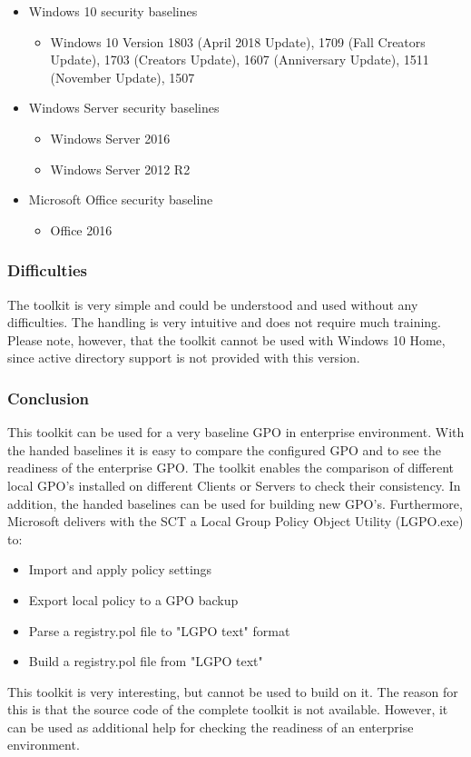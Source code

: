 \begin{itemize}
    \item Windows 10 security baselines
    \begin{itemize}
        \item Windows 10 Version 1803 (April 2018 Update), 1709 (Fall Creators Update), 1703 (Creators Update), 1607 (Anniversary Update), 1511 (November Update), 1507
    \end{itemize}
    \item Windows Server security baselines
    \begin{itemize}
        \item Windows Server 2016
        \item Windows Server 2012 R2
    \end{itemize}
    \item Microsoft Office security baseline
    \begin{itemize}
        \item Office 2016
    \end{itemize}
\end{itemize}

\subsubsection{Difficulties}
The toolkit is very simple and could be understood and used without any difficulties. The handling is very intuitive and does not require much training. Please note, however, that the toolkit cannot be used with Windows 10 Home, since active directory support is not provided with this version.

\subsubsection{Conclusion}
This toolkit can be used for a very baseline GPO in enterprise environment. With the handed baselines it is easy to compare the configured GPO and to see the readiness of the enterprise GPO. The toolkit enables the comparison of different local GPO's installed on different Clients or Servers to check their consistency. In addition, the handed baselines can be used for building new GPO's. Furthermore, Microsoft delivers with the SCT a Local Group Policy Object Utility (LGPO.exe) to:
\begin{itemize}
    \item Import and apply policy settings
    \item Export local policy to a GPO backup
    \item Parse a registry.pol file to "LGPO text" format
    \item Build a registry.pol file from "LGPO text"
\end{itemize}
This toolkit is very interesting, but cannot be used to build on it. The reason for this is that the source code of the complete toolkit is not available. However, it can be used as additional help for checking the readiness of an enterprise environment.

